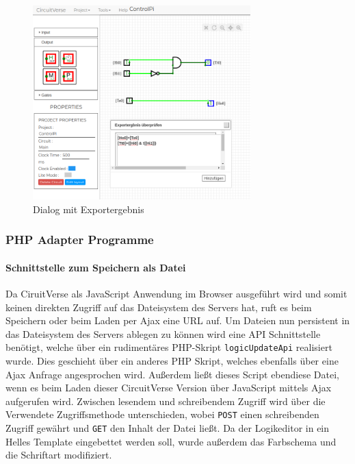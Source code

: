 \begin{figure}[H]
	\begin{center}
		\includegraphics[width=0.75\textwidth ,clip]{./images/circuitverseLogicBrightPrompt.png}
		\caption{Dialog mit Exportergebnis}
		\label{img:circuitVerseBrightPrompt}
	\end{center} 
\end{figure}




\subsubsection{PHP Adapter Programme}\label{kap:ums:adapterphp}
\paragraph{Schnittstelle zum Speichern als Datei}\label{par:saveFile}
Da CiruitVerse als JavaScript Anwendung im Browser ausgeführt wird und somit keinen direkten Zugriff auf das Dateisystem des Servers hat, ruft es beim Speichern oder beim Laden per Ajax eine URL auf. Um Dateien nun persistent in das Dateisystem des Servers ablegen zu können wird eine API Schnittstelle benötigt, welche über ein rudimentäres PHP-Skript \texttt{logicUpdateApi} realisiert wurde. 
Dies geschieht über ein anderes PHP Skript, welches  ebenfalls über eine Ajax Anfrage angesprochen wird. Außerdem ließt dieses Script ebendiese Datei, wenn es beim Laden dieser CircuitVerse Version über JavaScript mittels Ajax aufgerufen wird. Zwischen lesendem und schreibendem Zugriff wird über die Verwendete Zugriffsmethode unterschieden, wobei \texttt{POST} einen schreibenden Zugriff gewährt und \texttt{GET} den Inhalt der Datei ließt. Da der Logikeditor in ein Helles Template eingebettet werden soll, wurde außerdem das Farbschema und die Schriftart modifiziert. 

